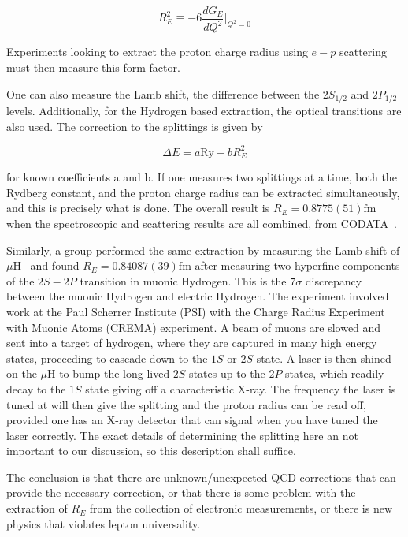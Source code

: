 \begin{equation}
    R_E^2 \equiv -6 \frac{d G_E}{d Q^2}\rvert_{Q^2=0}
\end{equation}

\noindent Experiments looking to extract the proton charge radius using $e-p$ scattering must then measure this form factor.

One can also measure the Lamb shift, the difference between the $2S_{1/2}$ and $2P_{1/2}$ levels.
Additionally, for the Hydrogen based extraction, the optical transitions are also used.
The correction to the splittings is given by

\begin{equation}
    \Delta E = a \textrm{Ry} + b R_E^2
\end{equation}

\noindent for known coefficients a and b. If one measures two splittings at a time, both the Rydberg constant, and the proton charge radius can be extracted simultaneously, and this is precisely what is done.
The overall result is $R_E = 0.8775(51)\textrm{fm}$ when the spectroscopic and scattering results are all combined, from CODATA~\cite{Mohr:2012tt}.

Similarly, a group performed the same extraction by measuring the Lamb shift of $\mu\textrm{H}$~\cite{Pohl:2010zza,Antognini:1900ns} and found $R_E = 0.84087(39)\textrm{fm}$ after measuring two hyperfine components of the $2S-2P$ transition in muonic Hydrogen.
This is the $7\sigma$ discrepancy between the muonic Hydrogen and electric Hydrogen.
The experiment involved work at the Paul Scherrer Institute (PSI) with the Charge Radius Experiment with Muonic Atoms (CREMA) experiment.
A beam of muons are slowed and sent into a target of hydrogen, where they are captured in many high energy states, proceeding to cascade down to the $1S$ or $2S$ state.
A laser is then shined on the $\mu\textrm{H}$ to bump the long-lived $2S$ states up to the $2P$ states, which readily decay to the $1S$ state giving off a characteristic X-ray.
The frequency the laser is tuned at will then give the splitting and the proton radius can be read off, provided one has an X-ray detector that can signal when you have tuned the laser correctly.
The exact details of determining the splitting here an not important to our discussion, so this description shall suffice.

The conclusion is that there are unknown/unexpected QCD corrections that can provide the necessary correction, or that there is some problem with the extraction of $R_E$ from the collection of electronic measurements, or there is new physics that violates lepton universality.

